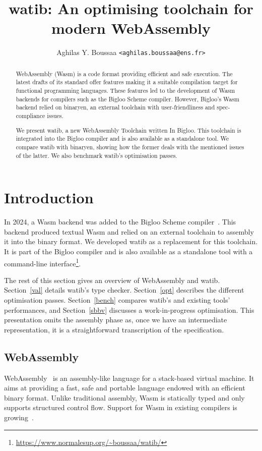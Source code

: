 \documentclass[a4paper,11pt]{article}
\author{Aghilas Y. Boussaa \texttt{<aghilas.boussaa@ens.fr>}}
\title{\textsf{watib}: An optimising toolchain for modern WebAssembly}
\begin{document}
\sloppy
\maketitle
\begin{abstract}
  WebAssembly (Wasm) is a code format providing efficient and safe execution.
  The latest drafts of its standard offer features making it a suitable
  compilation target for functional programming languages. These features led to
  the development of Wasm backends for compilers such as the Bigloo Scheme
  compiler. However, Bigloo's Wasm backend relied on binaryen, an external
  toolchain with user-friendliness and spec-compliance issues.

  We present \textsf{watib}, a new WebAssembly Toolchain written In Bigloo. This
  toolchain is integrated into the Bigloo compiler and is also available as a
  standalone tool. We compare \textsf{watib} with binaryen, showing how the
  former deals with the mentioned issues of the latter. We also benchmark
  \textsf{watib}'s optimisation passes.
\end{abstract}

\section{Introduction}
In 2024, a Wasm backend was added to the Bigloo Scheme compiler~\cite{Bigloo}.
This backend produced textual Wasm and relied on an external toolchain to
assembly it into the binary format. We developed \textsf{watib} as a replacement
for this toolchain. It is part of the Bigloo compiler and is also available as a
standalone tool with a command-line
interface\footnote{\url{https://www.normalesup.org/~boussaa/watib/}}.

The rest of this section gives an overview of WebAssembly and \textsf{watib}.
Section~\ref{val} details \textsf{watib}'s type checker. Section~\ref{opt}
describes the different optimisation passes. Section~\ref{bench} compares
\textsf{watib}'s and existing tools' performances, and Section~\ref{sbbv}
discusses a work-in-progress optimisation. This presentation omits the assembly
phase as, once we have an intermediate representation, it is a straightforward
transcription of the specification.
\subsection{WebAssembly}
WebAssembly~\cite{haas2017bringing} is an assembly-like language for a
stack-based virtual machine. It aims at providing a fast, safe and portable
language endowed with an efficient binary format. Unlike traditional assembly,
Wasm is statically typed and only supports structured control flow. Support for
Wasm in existing compilers is growing~\cite{emscripten, kotlin, ocaml}.
\end{document}
